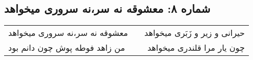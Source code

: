 \begin{center}
\section*{شماره ۸: معشوقه نه سر،‌نه سروری میخواهد}
\label{sec:008}
\begin{longtable}{l p{0.5cm} r}
معشوقه نه سر،‌نه سروری میخواهد
&&
حیرانی و زیر و زَبَری میخواهد
\\
من زاهد فوطه پوش چون دانم بود
&&
چون یار مرا قلندری میخواهد
\\
\end{longtable}
\end{center}
